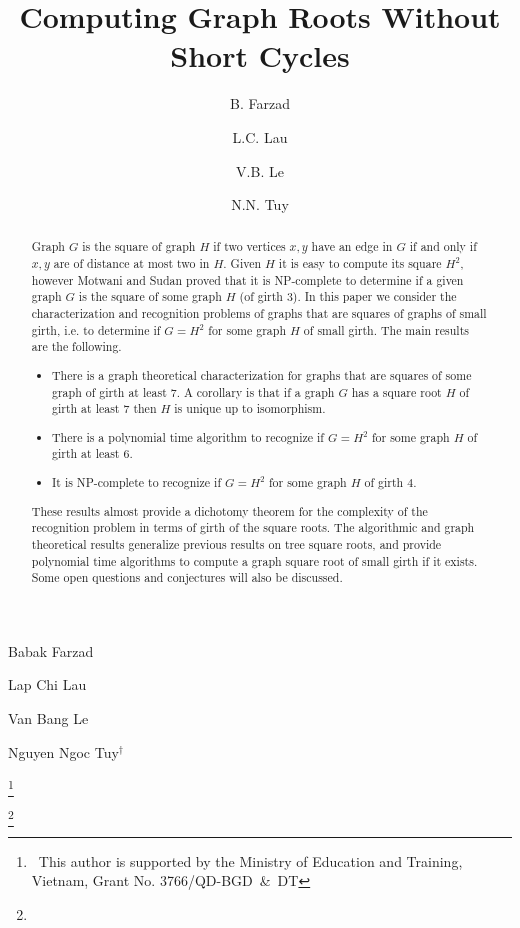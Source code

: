 \documentclass[proceedings]{stacs}
\newlength{\ai}
\begin{document}
\title[Computing Graph Roots Without Short Cycles]{Computing Graph Roots Without Short Cycles}

\author[ref1]{B. Farzad}{Babak Farzad}
\address[ref1]{Department of Mathematics, Brock University, Canada.}

\author[ref2]{L.C. Lau}{Lap Chi Lau}
\address[ref2]{Department of Computer Science and Engineering, The Chinese University of Hong Kong.}

\author[ref3]{V.B. Le}{Van Bang Le}
\address[ref3]{Universit\"at Rostock, Institut f\"ur Informatik, Germany.}

\author[ref3,ref4]{N.N. Tuy}{Nguyen Ngoc Tuy$^\dag$}
\address[ref4]{Hong Duc University, Vietnam.}
\thanks{\dag ~This author is supported by the Ministry of Education and Training, Vietnam, Grant No. 3766/QD-BGD~\&~DT}

\thanks{\color{white}{.}}

\begin{abstract}
\noindent
Graph $G$ is the square of graph $H$ if two vertices $x,y$ have an edge in
  $G$ if and only if $x,y$ are of distance at most two in $H$.
Given $H$ it is easy to compute its square $H^2$,
  however Motwani and Sudan proved that it is NP-complete
  to determine if a given graph $G$ is the square of some graph $H$ (of girth $3$).
In this paper we consider the characterization and recognition
  problems of graphs that are squares of graphs of small girth,
  i.e. to determine if $G=H^2$ for some graph $H$ of small girth.
The main results are the following.
\begin{itemize}
\item There is a graph theoretical characterization for graphs that are squares of
  some graph of girth at least $7$.
A corollary is that if a graph $G$ has a square root $H$ of girth at least $7$ then $H$ is unique up to isomorphism.
\item There is a polynomial time algorithm to recognize if $G=H^2$ for some graph $H$ of girth at least $6$.
\item It is NP-complete to recognize if $G=H^2$ for some graph $H$ of girth $4$.
\end{itemize}
These results almost provide a dichotomy theorem for the complexity
  of the recognition problem in terms of girth of the square roots.
The algorithmic and graph theoretical results generalize previous
  results on tree square roots, and provide polynomial time algorithms
  to compute a graph square root of small girth if it exists.
Some open questions and conjectures will also be discussed.
\end{abstract}
\end{document}
